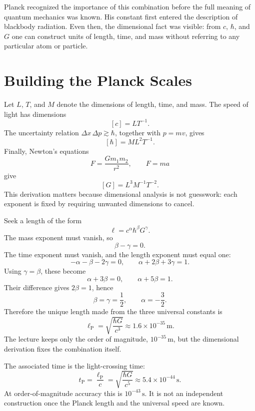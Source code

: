 Planck recognized the importance of this combination before the full meaning of quantum mechanics was known. His constant first entered the description of blackbody radiation. Even then, the dimensional fact was visible: from \(c\), \(\hbar\), and \(G\) one can construct units of length, time, and mass without referring to any particular atom or particle.

\section{Building the Planck Scales}

Let \(L\), \(T\), and \(M\) denote the dimensions of length, time, and mass. The speed of light has dimensions
\[
[c]=LT^{-1}.
\]
The uncertainty relation \(\Delta x\,\Delta p\gtrsim\hbar\), together with \(p=mv\), gives
\[
[\hbar]=ML^2T^{-1}.
\]
Finally, Newton's equations
\[
F=\frac{Gm_1m_2}{r^2},
\qquad
F=ma
\]
give
\[
[G]=L^3M^{-1}T^{-2}.
\]
This derivation matters because dimensional analysis is not guesswork: each exponent is fixed by requiring unwanted dimensions to cancel.

Seek a length of the form
\begin{equation}
\ell=c^\alpha\hbar^\beta G^\gamma.
\label{eq:c10-length-ansatz}
\end{equation}
The mass exponent must vanish, so
\[
\beta-\gamma=0.
\]
The time exponent must vanish, and the length exponent must equal one:
\[
-\alpha-\beta-2\gamma=0,
\qquad
\alpha+2\beta+3\gamma=1.
\]
Using \(\gamma=\beta\), these become
\[
\alpha+3\beta=0,
\qquad
\alpha+5\beta=1.
\]
Their difference gives \(2\beta=1\), hence
\[
\beta=\gamma=\frac12,
\qquad
\alpha=-\frac32.
\]
Therefore the unique length made from the three universal constants is
\begin{equation}
\ell_{\mathrm P}
=\sqrt{\frac{\hbar G}{c^3}}
\approx 1.6\times10^{-35}\,\mathrm m.
\label{eq:c10-planck-length}
\end{equation}
The lecture keeps only the order of magnitude, \(10^{-35}\,\mathrm m\), but the dimensional derivation fixes the combination itself.

The associated time is the light-crossing time:
\begin{equation}
t_{\mathrm P}
=\frac{\ell_{\mathrm P}}{c}
=\sqrt{\frac{\hbar G}{c^5}}
\approx 5.4\times10^{-44}\,\mathrm s.
\label{eq:c10-planck-time}
\end{equation}
At order-of-magnitude accuracy this is \(10^{-43}\,\mathrm s\). It is not an independent construction once the Planck length and the universal speed are known.

